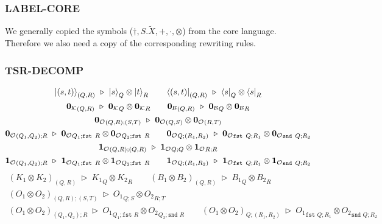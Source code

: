\documentclass[manuscript, review, timestamp]{acmart}
\newcommand*{\fst}{\texttt{fst }}
\newcommand*{\snd}{\texttt{snd }}
\newcommand*{\reduce}{\ \triangleright\ }
\begin{document}
\subsubsection*{\textsf{LABEL-CORE}}
We generally copied the symbols ($\dagger, S.\tilde{X}, +, \cdot, \otimes$) from the core language. Therefore we also need a copy of the corresponding rewriting rules.

\subsubsection*{\textsf{TSR-DECOMP}}

\begin{gather*}
  \ket{(s, t)}_{(Q, R)} \reduce \ket{s}_{Q} \otimes \ket{t}_{R}
  \qquad
  \bra{(s, t)}_{(Q, R)} \reduce \bra{s}_{Q} \otimes \bra{s}_{R} \\
  {\mathbf{0}_\mathcal{K}}_{(Q, R)} \reduce {\mathbf{0}_\mathcal{K}}_{Q} \otimes {\mathbf{0}_\mathcal{K}}_{R}
  \qquad
  {\mathbf{0}_\mathcal{B}}_{(Q, R)} \reduce {\mathbf{0}_\mathcal{B}}_{Q} \otimes {\mathbf{0}_\mathcal{B}}_{R} \\
  {\mathbf{0}_\mathcal{O}}_{(Q, R); (S, T)} \reduce {\mathbf{0}_\mathcal{O}}_{(Q, S)} \otimes {\mathbf{0}_\mathcal{O}}_{(R, T)} \\
  {\mathbf{0}_\mathcal{O}}_{(Q_1, Q_2); R} \reduce {\mathbf{0}_\mathcal{O}}_{Q_1; \fst R} \otimes {\mathbf{0}_\mathcal{O}}_{Q_2; \fst R}
  \qquad
  {\mathbf{0}_\mathcal{O}}_{Q; (R_1, R_2)} \reduce {\mathbf{0}_\mathcal{O}}_{\fst Q; R_1} \otimes {\mathbf{0}_\mathcal{O}}_{\snd Q; R_2} \\
  {\mathbf{1}_\mathcal{O}}_{(Q, R); (Q, R)} \reduce {\mathbf{1}_\mathcal{O}}_{Q; Q} \otimes {\mathbf{1}_\mathcal{O}}_{R; R} \\
  {\mathbf{1}_\mathcal{O}}_{(Q_1, Q_2); R} \reduce {\mathbf{1}_\mathcal{O}}_{Q_1; \fst R} \otimes {\mathbf{1}_\mathcal{O}}_{Q_2; \fst R}
  \qquad
  {\mathbf{1}_\mathcal{O}}_{Q; (R_1, R_2)} \reduce {\mathbf{1}_\mathcal{O}}_{\fst Q; R_1} \otimes {\mathbf{1}_\mathcal{O}}_{\snd Q; R_2}
\end{gather*}
\begin{gather*}
  (K_1 \otimes K_2)_{(Q, R)} \reduce {K_1}_{Q} \otimes {K_2}_{R}
  \qquad
  (B_1 \otimes B_2)_{(Q, R)} \reduce {B_1}_{Q} \otimes {B_2}_{R} \\
  (O_1 \otimes O_2)_{(Q, R); (S, T)} \reduce {O_1}_{Q; S} \otimes {O_2}_{R; T} \\
  (O_1 \otimes O_2)_{(Q_1, Q_2); R} \reduce {O_1}_{Q_1; \fst R} \otimes {O_2}_{Q_2; \snd R}
  \qquad
  (O_1 \otimes O_2)_{Q; (R_1, R_2)} \reduce {O_1}_{\fst Q; R_1} \otimes {O_2}_{\snd Q; R_2}
\end{gather*}
\end{document}
